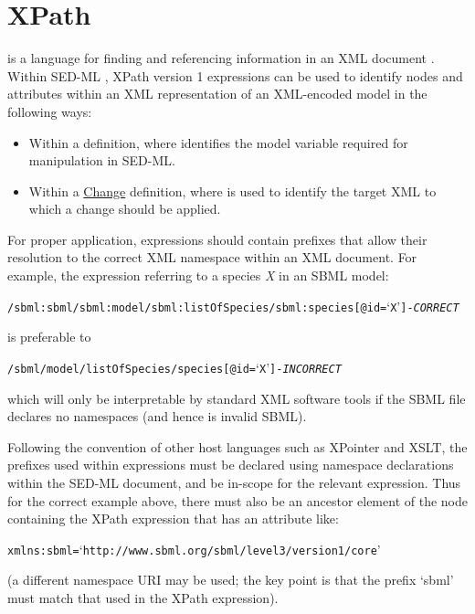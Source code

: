 \section{XPath}  
\label{sec:xpath}
 is a language for finding and referencing information in an XML document \citep{xpath:1999}. Within SED-ML \currentLV, XPath version 1 expressions can be used to identify nodes and attributes within an XML representation of an XML-encoded model in the following ways:

\begin{itemize}
	\item {Within a \Variable definition, where  identifies the model variable required for manipulation in SED-ML.}
	\item {Within a \hyperref[class:change]{Change} definition, where  is used to identify the target XML to which a change should be applied.}
\end{itemize}

For proper application,  expressions should contain prefixes that allow their resolution to the correct XML namespace within an XML document. For example, the  expression referring to a species \emph{X} in an SBML model:
\begin{alltt}
/sbml:sbml/sbml:model/sbml:listOfSpecies/sbml:species[@id=`X'] {\tickYes -\emph{CORRECT}}
\end{alltt}
is preferable to 
\begin{alltt}
/sbml/model/listOfSpecies/species[@id=`X'] {\tickNo -\emph{INCORRECT} }
\end{alltt}

which will only be interpretable by standard XML software tools if the SBML file declares no namespaces (and hence is invalid SBML).

Following the convention of other  host languages such as XPointer and XSLT, the prefixes used within  expressions must be declared using namespace declarations within the SED-ML document, and be in-scope for the relevant expression. Thus for the correct example above, there must also be an ancestor element of the node containing the XPath expression that has an attribute like:
\begin{alltt}
xmlns:sbml=`http://www.sbml.org/sbml/level3/version1/core'
\end{alltt}
(a different namespace URI may be used; the key point is that the prefix `sbml' must match that used in the XPath expression).


